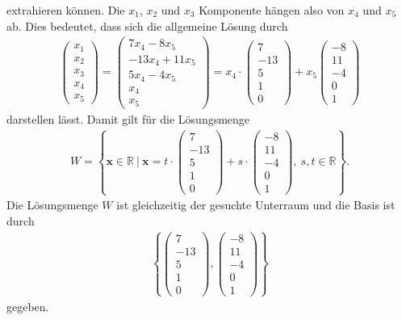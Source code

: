 extrahieren können.
Die $ x_1 $, $ x_2 $ und $ x_3 $ Komponente hängen also von $ x_4 $ und $ x_5 $ ab.
Dies bedeutet, dass sich die allgemeine Lösung durch
\begin{align*}
\begin{pmatrix}
x_1 \\ x_2 \\ x_3 \\ x_4 \\ x_5
\end{pmatrix}
=
\begin{pmatrix}
7 x_4 - 8 x_5\\
-13 x_4 + 11 x_5\\
5x_4 - 4 x_5\\
x_4 \\
x_5
\end{pmatrix}
=
x_4 \cdot
\begin{pmatrix}
7 \\ -13 \\ 5 \\1 \\ 0
\end{pmatrix}
+
x_5
\begin{pmatrix}
-8 \\ 11 \\ -  4 \\ 0 \\ 1
\end{pmatrix}
\end{align*}
darstellen lässt. Damit gilt für die Lösungsmenge
\begin{align*}
W = 
\left\lbrace 
\textbf{x} \in \mathbb{R} \ | \
\textbf{x} = 
t \cdot
\begin{pmatrix}
7 \\ -13 \\ 5 \\1 \\ 0
\end{pmatrix}
+
s \cdot
\begin{pmatrix}
-8 \\ 11 \\ -  4 \\ 0 \\ 1
\end{pmatrix},
\ s,t \in \mathbb{R}
\right\rbrace.
\end{align*}
Die Lösungsmenge $ W $ ist gleichzeitig der gesuchte Unterraum und die Basis ist durch
\begin{align*}
\left\lbrace
\begin{pmatrix}
7 \\ -13 \\ 5 \\1 \\ 0
\end{pmatrix},
\begin{pmatrix}
-8 \\ 11 \\ -  4 \\ 0 \\ 1
\end{pmatrix}
\right\rbrace
\end{align*}
gegeben.


\newpage